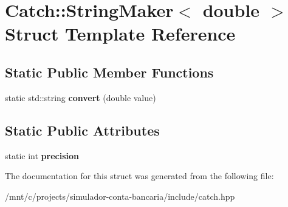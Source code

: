 \hypertarget{structCatch_1_1StringMaker_3_01double_01_4}{}\section{Catch\+:\+:String\+Maker$<$ double $>$ Struct Template Reference}
\label{structCatch_1_1StringMaker_3_01double_01_4}
\subsection*{Static Public Member Functions}
\begin{DoxyCompactItemize}
\item 
\mbox{\label{structCatch_1_1StringMaker_3_01double_01_4_acaa61529acad2462292c747d34e5f3d2}} 
static std\+::string {\bfseries convert} (double value)
\end{DoxyCompactItemize}
\subsection*{Static Public Attributes}
\begin{DoxyCompactItemize}
\item 
\mbox{\label{structCatch_1_1StringMaker_3_01double_01_4_a15fa2b093c532ece7f1d0c713ebaee67}} 
static int {\bfseries precision}
\end{DoxyCompactItemize}


The documentation for this struct was generated from the following file\+:\begin{DoxyCompactItemize}
\item 
/mnt/c/projects/simulador-\/conta-\/bancaria/include/catch.\+hpp\end{DoxyCompactItemize}
